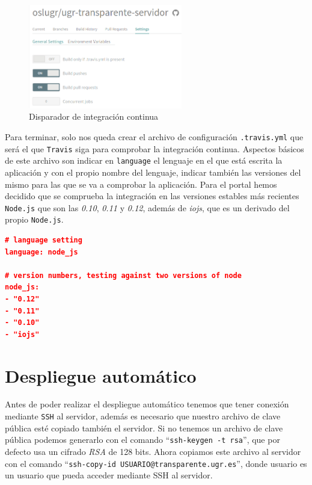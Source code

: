 \begin{figure}[!ht]
	\begin{center}
		\includegraphics[width=0.6\textwidth]{../images/config_travis.png}
		\caption{Disparador de integración continua}
		\label{fig:config_travis}
	\end{center}
\end{figure}

Para terminar, solo nos queda crear el archivo de configuración {\tt .travis.yml} que será el que {\tt Travis} siga para comprobar la integración continua. Aspectos básicos de este archivo son indicar en {\tt language} el lenguaje en el que está escrita la aplicación y con el propio nombre del lenguaje, indicar también las versiones del mismo para las que se va a comprobar la aplicación. Para el portal hemos decidido que se comprueba la integración en las versiones estables más recientes {\tt Node.js} que son las \textit{0.10}, \textit{0.11} y \textit{0.12}, además de \textit{iojs}, que es un derivado del propio {\tt Node.js}.

\begin{lstlisting}[language=json,caption={Archivo de configuración de Travis CI},label={lst:json_personal}]
# language setting
language: node_js

# version numbers, testing against two versions of node
node_js:
- "0.12"
- "0.11"
- "0.10"
- "iojs"
\end{lstlisting}

\section{Despliegue automático}

Antes de poder realizar el despliegue automático tenemos que tener conexión mediante {\tt SSH} al servidor, además es necesario que nuestro archivo de clave pública esté copiado también el servidor. Si no tenemos un archivo de clave pública podemos generarlo con el comando ``{\tt ssh-keygen -t rsa}'', que por defecto usa un cifrado \textit{RSA} de 128 bits. Ahora copiamos este archivo al servidor con el comando ``{\tt ssh-copy-id USUARIO@transparente.ugr.es}'', donde usuario es un usuario que pueda acceder mediante SSH al servidor.

